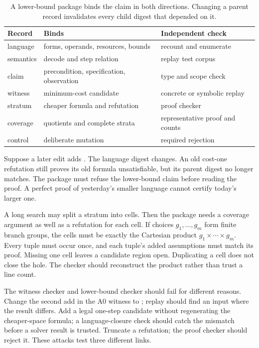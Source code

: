\begin{table}[htbp]
\centering
\caption{A lower-bound package binds the claim in both directions. Changing a
parent record invalidates every child digest that depended on it.}
\begin{tabular}{@{}p{}p{}p{}@{}}
\toprule
Record & Binds & Independent check \\
\midrule
language & forms, operands, resources, bounds & recount and enumerate \\
semantics & decode and step relation & replay test corpus \\
claim & precondition, specification, observation & type and scope check \\
witness & minimum-cost candidate & concrete or symbolic replay \\
stratum & cheaper formula and refutation & proof checker \\
coverage & quotients and complete strata & representative proof and counts \\
control & deliberate mutation & required rejection \\
\bottomrule
\end{tabular}
\label{tab:minimality-package}
\end{table}

Suppose a later edit adds . The language digest changes.
An old cost-one refutation still proves its old formula unsatisfiable, but its
parent digest no longer matches. The package must refuse the lower-bound claim
before reading the proof. A perfect proof of yesterday's smaller language
cannot certify today's larger one.

A long search may split a stratum into cells. Then the package needs a coverage
argument as well as a refutation for each cell. If choices
\(g_1,\ldots,g_m\) form finite branch groups, the cells must be exactly the
Cartesian product \(g_1\times\cdots\times g_m\). Every tuple must occur once,
and each tuple's added assumptions must match its proof. Missing one cell
leaves a candidate region open. Duplicating a cell does not close the hole.
The checker should reconstruct the product rather than trust a line count.

The witness checker and lower-bound checker should fail for different reasons.
Change the second add in the A0 witness to ; replay should
find an input where the result differs. Add a legal one-step 
candidate without regenerating the cheaper-space formula; a language-closure
check should catch the mismatch before a solver result is trusted. Truncate a
refutation; the proof checker should reject it. These attacks test three
different links.

